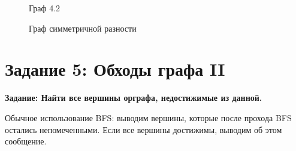 \documentclass[otchet]{SCWorks}
\begin{document}
\begin{figure}[H]
	\caption{Граф 4.2}
	\label{gr4_2}
\end{figure}

\begin{figure}[H]
	\caption{Граф симметричной разности}
	\label{gr4_res}
\end{figure}

\section{Задание 5: Обходы графа II}

\textbf{Задание: Найти все вершины орграфа, недостижимые из данной.}

Обычное использование BFS: выводим вершины, которые после прохода BFS остались непомеченными. Если все вершины достижимы, выводим об этом сообщение.
\end{document}
